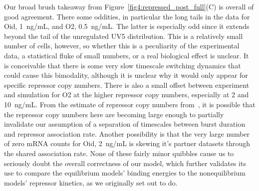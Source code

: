 Our broad brush takeaway from Figure~\ref{fig4:repressed_post_full}(C) is
overall of good agreement. There some oddities, in particular the long tails in
the data for Oid, 1~ng/mL, and O2, 0.5~ng/mL. The latter is especially odd since
it extends beyond the tail of the unregulated UV5 distribution. This is a
relatively small number of cells, however, so whether this is a peculiarity of
the experimental data, a statistical fluke of small numbers, or a real
biological effect is unclear. It is conceivable that there is some very slow
timescale switching dynamics that could cause this bimodality, although it is
unclear why it would only appear for specific repressor copy numbers. There is
also a small offset between experiment and simulation for O2 at the higher
repressor copy numbers, especially at 2 and 10~ng/mL.
From the estimate of repressor copy numbers from~\cite{Jones2014}, it is
possible that the repressor copy numbers here are becoming large enough to
partially invalidate our assumption of a separation of timescales between
burst duration and repressor association rate. Another possibility is that
the very large number of zero mRNA counts for Oid, 2~ng/mL is skewing it's partner
datasets through the shared association rate.
None of these fairly minor quibbles cause us to
seriously doubt the overall correctness of our model, which further validates
its use to compare the equilibrium models' binding energies to the
nonequilibrium models' repressor kinetics, as we originally set out to do.